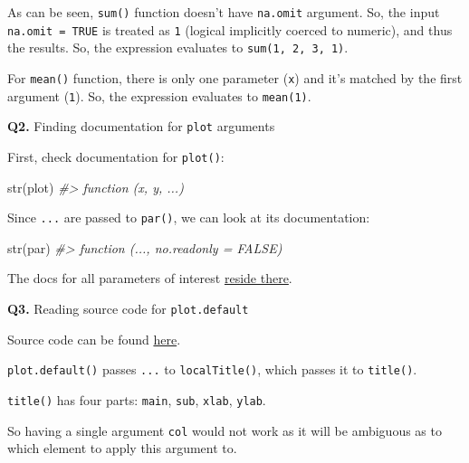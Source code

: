 \documentclass[
]{book}
\newenvironment{Shaded}{\begin{snugshade}}{\end{snugshade}}
\newcommand{\CommentTok}[1]{\textcolor[rgb]{0.56,0.35,0.01}{\textit{#1}}}
\newcommand{\FunctionTok}[1]{\textcolor[rgb]{0.00,0.00,0.00}{#1}}
\newcommand{\NormalTok}[1]{#1}
\begin{document}
As can be seen, \texttt{sum()} function doesn't have \texttt{na.omit} argument. So, the input \texttt{na.omit\ =\ TRUE} is treated as \texttt{1} (logical implicitly coerced to numeric), and thus the results. So, the expression evaluates to \texttt{sum(1,\ 2,\ 3,\ 1)}.

For \texttt{mean()} function, there is only one parameter (\texttt{x}) and it's matched by the first argument (\texttt{1}). So, the expression evaluates to \texttt{mean(1)}.

\textbf{Q2.} Finding documentation for \texttt{plot} arguments

First, check documentation for \texttt{plot()}:

\begin{Shaded}
\begin{Highlighting}[]
\FunctionTok{str}\NormalTok{(plot)}
\CommentTok{\#\textgreater{} function (x, y, ...)}
\end{Highlighting}
\end{Shaded}

Since \texttt{...} are passed to \texttt{par()}, we can look at its documentation:

\begin{Shaded}
\begin{Highlighting}[]
\FunctionTok{str}\NormalTok{(par)}
\CommentTok{\#\textgreater{} function (..., no.readonly = FALSE)}
\end{Highlighting}
\end{Shaded}

The docs for all parameters of interest \href{https://rdrr.io/r/graphics/par.html}{reside there}.

\textbf{Q3.} Reading source code for \texttt{plot.default}

Source code can be found \href{https://github.com/wch/r-source/blob/79e73dba5259b25ec30118d45fea64aeac0f41dc/src/library/graphics/R/plot.R\#L51-L84}{here}.

\texttt{plot.default()} passes \texttt{...} to \texttt{localTitle()}, which passes it to \texttt{title()}.

\texttt{title()} has four parts: \texttt{main}, \texttt{sub}, \texttt{xlab}, \texttt{ylab}.

So having a single argument \texttt{col} would not work as it will be ambiguous as to which element to apply this argument to.
\end{document}
